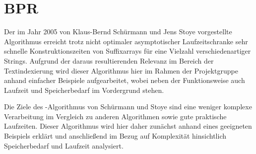 \section{BPR}



Der  im Jahr 2005 von Klaus-Bernd Schürmann und Jens Stoye vorgestellte Algorithmus \bpr erreicht trotz nicht optimaler asymptotischer Laufzeitschranke sehr schnelle Konstruktionszeiten von Suffixarrays für eine Vielzahl verschiedenartiger Strings. Aufgrund der daraus resultierenden Relevanz im Bereich der Textindexierung wird dieser Algorithmus hier im Rahmen der Projektgruppe \sacabench anhand einfacher Beispiele aufgearbeitet, wobei neben der Funktionsweise auch Laufzeit und Speicherbedarf im Vordergrund stehen.\par
Die Ziele des \bpr-Algorithmus von Schürmann und Stoye \cite{saca:2} sind eine weniger komplexe Verarbeitung im Vergleich zu anderen Algorithmen sowie gute praktische Laufzeiten. Dieser Algorithmus wird hier daher zunächst anhand eines geeigneten Beispiels erklärt und anschließend im Bezug auf Komplexität hinsichtlich Speicherbedarf und Laufzeit analysiert.





